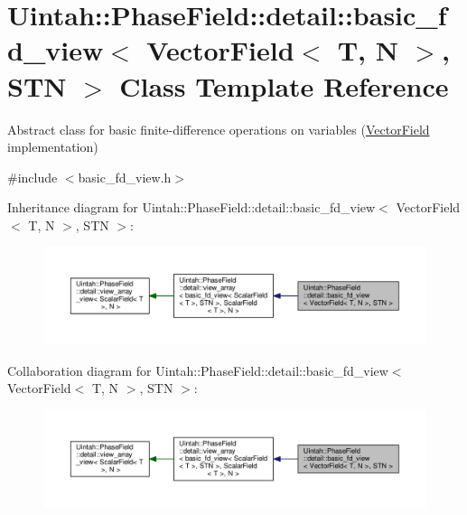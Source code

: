 \hypertarget{classUintah_1_1PhaseField_1_1detail_1_1basic__fd__view_3_01VectorField_3_01T_00_01N_01_4_00_01STN_01_4}{}\section{Uintah\+:\+:Phase\+Field\+:\+:detail\+:\+:basic\+\_\+fd\+\_\+view$<$ Vector\+Field$<$ T, N $>$, S\+TN $>$ Class Template Reference}
\label{classUintah_1_1PhaseField_1_1detail_1_1basic__fd__view_3_01VectorField_3_01T_00_01N_01_4_00_01STN_01_4}


Abstract class for basic finite-\/difference operations on variables (\hyperlink{structUintah_1_1PhaseField_1_1VectorField}{Vector\+Field} implementation)  




{\ttfamily \#include $<$basic\+\_\+fd\+\_\+view.\+h$>$}



Inheritance diagram for Uintah\+:\+:Phase\+Field\+:\+:detail\+:\+:basic\+\_\+fd\+\_\+view$<$ Vector\+Field$<$ T, N $>$, S\+TN $>$\+:\nopagebreak
\begin{figure}[H]
\begin{center}
\leavevmode
\includegraphics[width=350pt]{classUintah_1_1PhaseField_1_1detail_1_1basic__fd__view_3_01VectorField_3_01T_00_01N_01_4_00_01STN_01_4__inherit__graph}
\end{center}
\end{figure}


Collaboration diagram for Uintah\+:\+:Phase\+Field\+:\+:detail\+:\+:basic\+\_\+fd\+\_\+view$<$ Vector\+Field$<$ T, N $>$, S\+TN $>$\+:\nopagebreak
\begin{figure}[H]
\begin{center}
\leavevmode
\includegraphics[width=350pt]{classUintah_1_1PhaseField_1_1detail_1_1basic__fd__view_3_01VectorField_3_01T_00_01N_01_4_00_01STN_01_4__coll__graph}
\end{center}
\end{figure}
